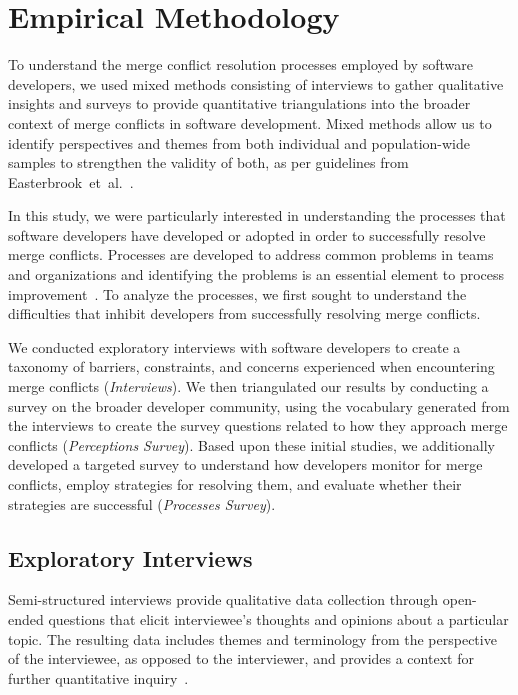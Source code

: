 
\section{Empirical Methodology}\label{methodology}


To understand the merge conflict resolution processes employed by software developers, we used mixed methods consisting of interviews to gather qualitative insights and surveys to provide quantitative triangulations into the broader context of merge conflicts in software development.
Mixed methods allow us to identify perspectives and themes from both individual and population-wide samples to strengthen the validity of both, as per guidelines from \mbox{Easterbrook et al.}~\cite{easterbrook2008selecting}.

In this study, we were particularly interested in understanding the processes that software developers have developed or adopted in order to successfully resolve merge conflicts.
Processes are developed to address common problems in teams and organizations and identifying the problems is an essential element to process improvement~\cite{beecham2003software}.
To analyze the processes, we first sought to understand the difficulties that inhibit developers from successfully resolving merge conflicts.

We conducted exploratory interviews with software developers to create a taxonomy of barriers, constraints, and concerns experienced when encountering merge conflicts (\textit{Interviews}).
We then triangulated our results by conducting a survey on the broader developer community, using the vocabulary generated from the interviews to create the survey questions related to how they approach merge conflicts (\textit{Perceptions Survey}).
Based upon these initial studies, we additionally developed a targeted survey to understand how developers monitor for merge conflicts, employ strategies for resolving them, and evaluate whether their strategies are successful (\textit{Processes Survey}).

\subsection{Exploratory Interviews}\label{interviews}

Semi-structured interviews provide qualitative data collection through open-ended questions that elicit interviewee's thoughts and opinions about a particular topic.
The resulting data includes themes and terminology from the perspective of the interviewee, as opposed to the interviewer, and provides a context for further quantitative inquiry~\cite{easterbrook2008selecting}.

